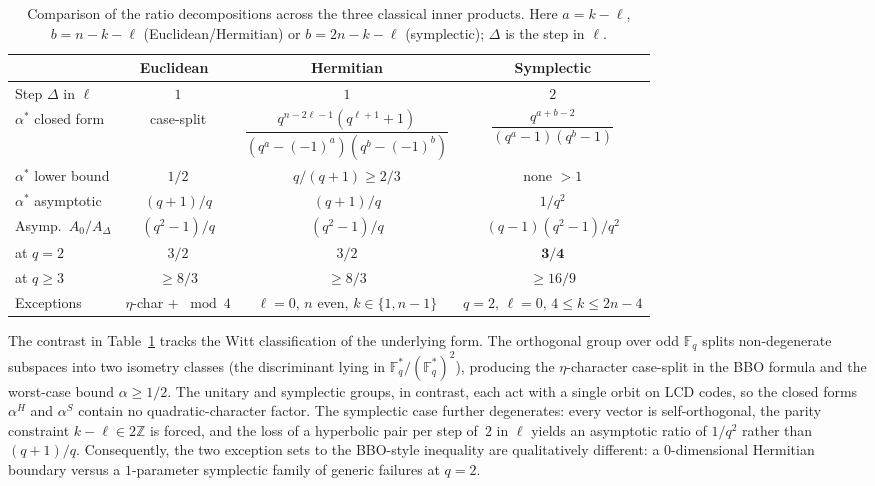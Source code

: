 \documentclass[11pt]{article}
\theoremstyle{plain}
\theoremstyle{remark}
\newcommand{\F}{\mathbb{F}}
\begin{document}
\begin{table}[h]
\centering
\footnotesize
\caption{Comparison of the ratio decompositions across the three classical
inner products. Here $a = k - \ell$, $b = n - k - \ell$ (Euclidean/Hermitian)
or $b = 2n - k - \ell$ (symplectic); $\Delta$ is the step in $\ell$.}
\label{tab:comparison}
\setlength{\tabcolsep}{2pt}
\begin{tabular}{l|c|c|c}
\toprule
& Euclidean~\cite{BBOz2026} & Hermitian & Symplectic \\
\midrule
Step $\Delta$ in $\ell$ & $1$ & $1$ & $2$ \\[2pt]
$\alpha^*$ closed form &
   case-split &
   $\dfrac{q^{n-2\ell-1}(q^{\ell+1}+1)}{(q^a-(-1)^a)(q^b-(-1)^b)}$ &
   $\dfrac{q^{a+b-2}}{(q^a-1)(q^b-1)}$ \\[6pt]
$\alpha^*$ lower bound & $1/2$ & $q/(q+1) \geq 2/3$ & none $> 1$ \\
$\alpha^*$ asymptotic & $(q+1)/q$ & $(q+1)/q$ & $1/q^2$ \\[2pt]
Asymp.\ $A_0/A_\Delta$ & $(q^2{-}1)/q$ & $(q^2{-}1)/q$ & $(q{-}1)(q^2{-}1)/q^2$ \\
\;at $q = 2$ & $3/2$ & $3/2$ & $\mathbf{3/4}$ \\
\;at $q \geq 3$ & $\geq 8/3$ & $\geq 8/3$ & $\geq 16/9$ \\
\midrule
Exceptions & $\eta$-char + $\bmod 4$ & $\ell{=}0,\,n$ even, $k{\in}\{1,n{-}1\}$ & $q{=}2,\,\ell{=}0,\,4{\leq}k{\leq}2n{-}4$ \\
\bottomrule
\end{tabular}
\end{table}

The contrast in Table~\ref{tab:comparison} tracks the Witt classification
of the underlying form. The orthogonal group over odd $\F_q$ splits
non-degenerate subspaces into two isometry classes (the discriminant lying in
$\F_q^*/(\F_q^*)^2$), producing the $\eta$-character case-split in the BBO
formula and the worst-case bound $\alpha \geq 1/2$. The unitary and symplectic
groups, in contrast, each act with a single orbit on LCD codes, so the closed
forms $\alpha^H$ and $\alpha^S$ contain no quadratic-character factor. The
symplectic case further degenerates: every vector is self-orthogonal, the
parity constraint $k - \ell \in 2\mathbb{Z}$ is forced, and the loss of a
hyperbolic pair per step of~$2$ in $\ell$ yields an asymptotic ratio of
$1/q^2$ rather than $(q+1)/q$. Consequently, the two exception sets to the
BBO-style inequality are qualitatively different: a $0$-dimensional Hermitian
boundary versus a $1$-parameter symplectic family of generic failures at
$q = 2$.
\end{document}
